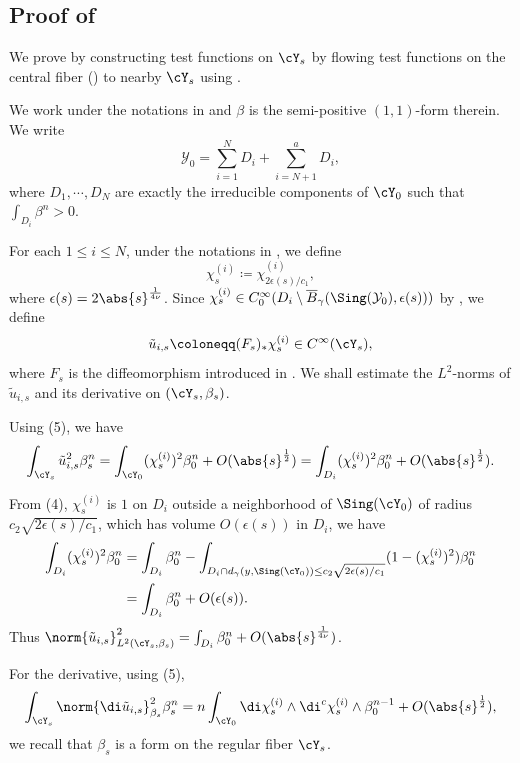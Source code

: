 \documentclass[12pt]{amsart}
\begin{document}
\subsection{Proof of 
}
We prove  by constructing test functions on $\cY_s$ by
flowing test functions on the central fiber
()
to nearby $\cY_s$ using .

We work under the notations in  and $\beta$
is the semi-positive $(1, 1)$-form therein.
We write  
\[
\mathcal{Y}_{0} = \sum_{i=1}^{N} D_{i} + \sum_{i=N+1}^{a} D_{i},
\]
where $D_1, \cdots, D_N$ are exactly the irreducible components
of $\cY_0$ such that $\int_{D_i} \beta^n > 0$.

For each $1 \leq i \leq N$, under the notations in , we define
\[
\chi^{(i)}_s \coloneqq \chi^{(i)}_{2\epsilon(s)/c_1},
\]
where $\epsilon(s) = 2 \abs{s}^{\frac{1}{4\nu}}$. Since 
$\chi^{(i)}_s \in C_{0}^{\infty}(D_i \setminus \overline{B}_{\gamma}(\Sing(\mathcal{Y}_{0}), \epsilon(s)))$ by , we
define 
\[
\tilde{u}_{i, s} \coloneqq (F_s)_* \chi^{(i)}_s \in C^\infty(\cY_s),
\]
where $F_s$ is the diffeomorphism introduced in . We shall estimate the $L^2$-norms
of $\tilde{u}_{i, s}$ and its derivative on $(\cY_s, \beta_s)$.

Using (5), we have 
\[
\int_{\cY_s} \tilde{u}_{i, s}^2 \beta_s^n = \int_{\cY_0} (\chi^{(i)}_s)^2 \beta_0^n 
+ O(\abs{s}^{\frac{1}{2}}) = \int_{D_i} (\chi^{(i)}_s)^2 \beta_0^n 
+ O(\abs{s}^{\frac{1}{2}}).
\]

From (4), $\chi^{(i)}_s$
is $1$ on $D_i$ outside a neighborhood of $\Sing(\cY_0)$ of radius
$c_2 \sqrt{2\epsilon(s)/c_1}$, which has volume $O(\epsilon(s))$
in $D_i$, we have 
\begin{align*}
    \int_{D_i} (\chi^{(i)}_s)^2 \beta_0^n 
    &= \int_{D_i} \beta_0^n - \int_{D_i \cap d_\gamma(y,\Sing(\cY_0))\leq c_2\sqrt{2\epsilon(s)/c_1}} (1 - (\chi^{(i)}_s)^2) \beta_0^n
    \\
    &= \int_{D_i} \beta_0^n + O(\epsilon(s)).
\end{align*}
Thus $\norm{\tilde{u}_{i, s}}^2_{L^2(\cY_s, \beta_s)} = \int_{D_i} \beta_0^n + O(\abs{s}^{\frac{1}{4\nu}})$.

For the derivative, using (5),
\[
\int_{\cY_s} \norm{\di \tilde{u}_{i, s}}_{\beta_s}^2 \beta_s^n
= n\int_{\cY_0} \di \chi^{(i)}_s \wedge \di^c \chi^{(i)}_s \wedge\beta_0^{n - 1} + O(\abs{s}^{\frac{1}{2}}),
\]
we recall that $\beta_s$ is a \Kahler form on the regular fiber 
$\cY_s$.
\end{document}

